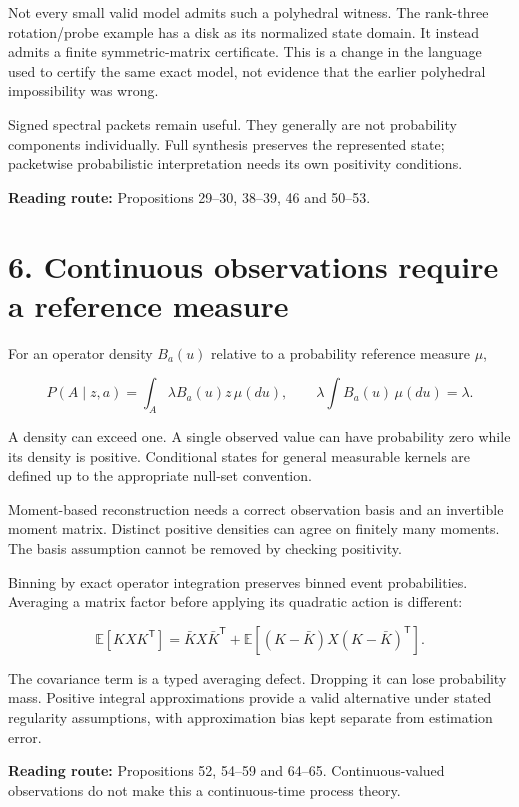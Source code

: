 \documentclass[11pt,letterpaper]{article}
\begin{document}
Not every small valid model admits such a polyhedral witness. The
rank-three rotation/probe example has a disk as its normalized state
domain. It instead admits a finite symmetric-matrix certificate. This is
a change in the language used to certify the same exact model, not
evidence that the earlier polyhedral impossibility was wrong.

Signed spectral packets remain useful. They generally are not
probability components individually. Full synthesis preserves the
represented state; packetwise probabilistic interpretation needs its own
positivity conditions.

\textbf{Reading route:} Propositions 29--30, 38--39, 46 and 50--53.

\section{6. Continuous observations require a reference
measure}\label{continuous-observations-require-a-reference-measure}

For an operator density \(B_a(u)\) relative to a probability reference
measure \(\mu\),

\[
P(A\mid z,a)=\int_A\lambda B_a(u)z\,\mu(du),
\qquad
\lambda\int B_a(u)\,\mu(du)=\lambda.
\]

A density can exceed one. A single observed value can have probability
zero while its density is positive. Conditional states for general
measurable kernels are defined up to the appropriate null-set
convention.

Moment-based reconstruction needs a correct observation basis and an
invertible moment matrix. Distinct positive densities can agree on
finitely many moments. The basis assumption cannot be removed by
checking positivity.

Binning by exact operator integration preserves binned event
probabilities. Averaging a matrix factor before applying its quadratic
action is different:

\[
\mathbb E[KXK^{\mathsf T}]
=\bar KX\bar K^{\mathsf T}
+\mathbb E[(K-\bar K)X(K-\bar K)^{\mathsf T}].
\]

The covariance term is a typed averaging defect. Dropping it can lose
probability mass. Positive integral approximations provide a valid
alternative under stated regularity assumptions, with approximation bias
kept separate from estimation error.

\textbf{Reading route:} Propositions 52, 54--59 and 64--65.
Continuous-valued observations do not make this a continuous-time
process theory.
\end{document}
